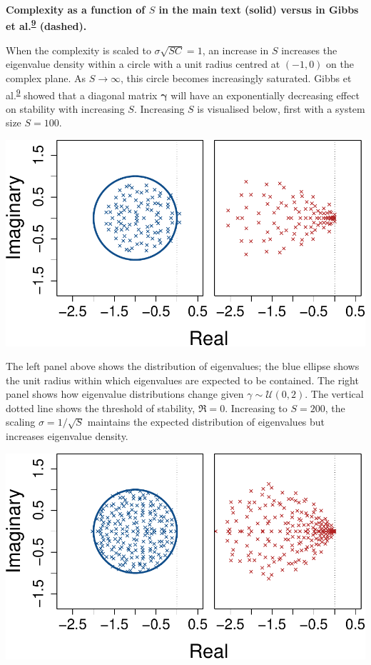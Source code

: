 \documentclass[]{article}
\begin{document}
\textbf{Complexity as a function of \(S\) in the main text (solid)
versus in Gibbs et
al.\textsuperscript{\protect\hyperlink{ref-Gibbs2017}{9}} (dashed).}

When the complexity is scaled to \(\sigma\sqrt{SC} = 1\), an increase in
\(S\) increases the eigenvalue density within a circle with a unit
radius centred at \((-1, 0)\) on the complex plane. As \(S \to \infty\),
this circle becomes increasingly saturated. Gibbs et
al.\textsuperscript{\protect\hyperlink{ref-Gibbs2017}{9}} showed that a
diagonal matrix \(\mathbf{\gamma}\) will have an exponentially
decreasing effect on stability with increasing \(S\). Increasing \(S\)
is visualised below, first with a system size \(S = 100\).

\includegraphics{unnamed-chunk-36-1.pdf}

The left panel above shows the distribution of eigenvalues; the blue
ellipse shows the unit radius within which eigenvalues are expected to
be contained. The right panel shows how eigenvalue distributions change
given \(\gamma \sim \mathcal{U}(0,2)\). The vertical dotted line shows
the threshold of stability, \(\Re = 0\). Increasing to \(S = 200\), the
scaling \(\sigma = 1 / \sqrt{S}\) maintains the expected distribution of
eigenvalues but increases eigenvalue density.

\includegraphics{unnamed-chunk-37-1.pdf}
\end{document}
